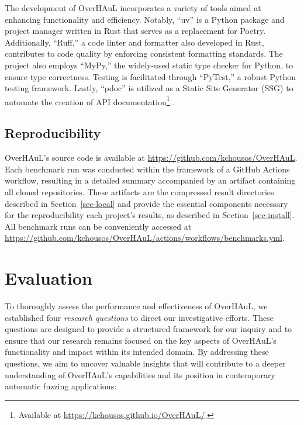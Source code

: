 \documentclass[
  a4paper,
]{scrreprt}
\theoremstyle{definition}
\theoremstyle{remark}
\begin{document}
The development of OverHAuL incorporates a variety of tools aimed at
enhancing functionality and efficiency. Notably, ``uv'' is a Python
package and project manager written in Rust that serves as a replacement
for Poetry. Additionally, ``Ruff,'' a code linter and formatter also
developed in Rust, contributes to code quality by enforcing consistent
formatting standards. The project also employs ``MyPy,'' the widely-used
static type checker for Python, to ensure type correctness. Testing is
facilitated through ``PyTest,'' a robust Python testing framework.
Lastly, ``pdoc'' is utilized as a Static Site Generator (SSG) to
automate the creation of API documentation\footnote{Available at
  \url{https://kchousos.github.io/OverHAuL/}.}
\autocite{astral2025,astral2025a,cortesi2025,pytestdevteam2025,pythonsoftwarefoundation2025}.

\section{Reproducibility}\label{reproducibility}

OverHAuL's source code is available at
\url{https://github.com/kchousos/OverHAuL}. Each benchmark run was
conducted within the framework of a GitHub Actions workflow, resulting
in a detailed summary accompanied by an artifact containing all cloned
repositories. These artifacts are the compressed result directories
described in Section~\ref{sec-local} and provide the essential
components necessary for the reproducibility each project's results, as
described in Section~\ref{sec-install}. All benchmark runs can be
conveniently accessed at
\url{https://github.com/kchousos/OverHAuL/actions/workflows/benchmarks.yml}.


\chapter{Evaluation}\label{sec-eval}

To thoroughly assess the performance and effectiveness of OverHAuL, we
established four \emph{research questions} to direct our investigative
efforts. These questions are designed to provide a structured framework
for our inquiry and to ensure that our research remains focused on the
key aspects of OverHAuL's functionality and impact within its intended
domain. By addressing these questions, we aim to uncover valuable
insights that will contribute to a deeper understanding of OverHAuL's
capabilities and its position in contemporary automatic fuzzing
applications:
\end{document}
